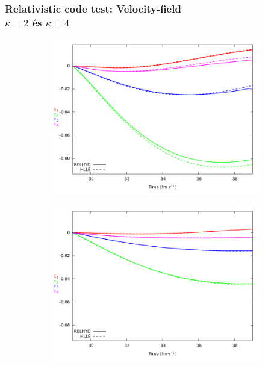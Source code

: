 \documentclass{beamer}
\begin{document}
\begin{frame}[noframenumbering]
\frametitle{Relativistic code test: Velocity-field \\ $\kappa=2$ és $\kappa=4$}
\begin{center}
\begin{figure}[H]
	\centering
    \begin{subfigure}[b]{0.49\textwidth}
    		\includegraphics[width=\textwidth]{pic/res/hr_v_kappa=2}
	\end{subfigure}
	\begin{subfigure}[b]{0.49\textwidth}
        	\includegraphics[width=\textwidth]{pic/res/hr_v_kappa=4}
	\end{subfigure}
\end{figure}
\end{center}
\end{frame}
\end{document}
